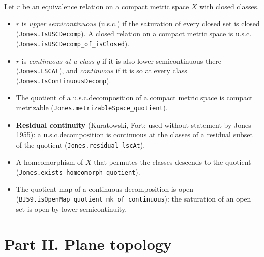 \documentclass[11pt]{article}
\newcommand{\lean}[1]{\texttt{#1}}
\begin{document}
Let $r$ be an equivalence relation on a compact metric space $X$ with closed classes.

\begin{itemize}
  \item $r$ is \emph{upper semicontinuous} (u.s.c.\@) if the saturation of every closed set is closed (\lean{Jones.\hspace{0pt}IsUSCDecomp}). A closed relation on a compact metric space is u.s.c.\@ (\lean{Jones.\hspace{0pt}isUSCDecomp\_\hspace{0pt}of\_\hspace{0pt}isClosed}).
  \item $r$ is \emph{continuous at a class} $g$ if it is also lower semicontinuous there (\lean{Jones.\hspace{0pt}LSCAt}), and \emph{continuous} if it is so at every class (\lean{Jones.\hspace{0pt}IsContinuousDecomp}).
  \item The quotient of a u.s.c.\@ decomposition of a compact metric space is compact metrizable (\lean{Jones.\hspace{0pt}metrizableSpace\_\hspace{0pt}quotient}).
  \item \textbf{Residual continuity} (Kuratowski, Fort; used without statement by Jones 1955): a u.s.c.\@ decomposition is continuous at the classes of a residual subset of the quotient (\lean{Jones.\hspace{0pt}residual\_\hspace{0pt}lscAt}).
  \item A homeomorphism of $X$ that permutes the classes descends to the quotient (\lean{Jones.\hspace{0pt}exists\_\hspace{0pt}homeomorph\_\hspace{0pt}quotient}).
  \item The quotient map of a continuous decomposition is open (\lean{BJ59.\hspace{0pt}isOpenMap\_\hspace{0pt}quotient\_\hspace{0pt}mk\_\hspace{0pt}of\_\hspace{0pt}continuous}): the saturation of an open set is open by lower semicontinuity.
\end{itemize}

\bigskip

\part*{Part II. Plane topology}
\end{document}
